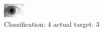 \begin{figure}[h!]
\begin{center}
\includegraphics[width=0.60\columnwidth]{figures/ID1911_class_4_target_3.png}
\end{center}
\caption{ Classification: 4 actual target: 3}
\label{fig:ID1911_class_4_target_3}
\end{figure}
